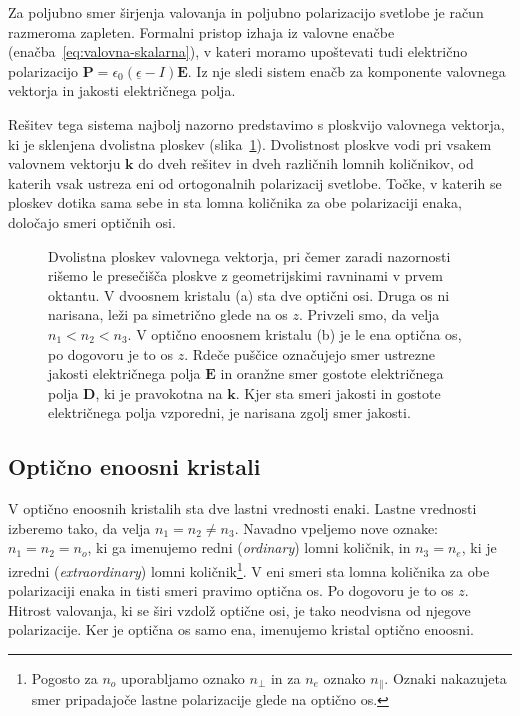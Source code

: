 Za poljubno smer širjenja valovanja in poljubno polarizacijo svetlobe je račun razmeroma zapleten. 
Formalni pristop izhaja iz valovne enačbe (enačba~\ref{eq:valovna-skalarna}), v kateri
moramo upoštevati tudi električno polarizacijo 
$\mathbf{P} = \epsilon_{0}(\underline{\epsilon}-I)\mathbf{E}$. Iz nje sledi 
sistem enačb za komponente valovnega vektorja in jakosti električnega polja. 

Rešitev tega sistema najbolj nazorno predstavimo s ploskvijo valovnega vektorja, 
ki je sklenjena dvolistna ploskev (slika~\ref{kploskev}). Dvolistnost ploskve
vodi pri vsakem valovnem vektorju $\mathbf{k}$ do dveh rešitev in dveh različnih lomnih
količnikov, od katerih vsak ustreza eni od ortogonalnih polarizacij svetlobe. Točke, v katerih
se ploskev dotika sama sebe in sta lomna količnika za obe polarizaciji enaka, 
določajo smeri optičnih osi. 
\begin{figure}[h]
\centering
\def\svgwidth{140truemm} 

\caption{Dvolistna ploskev valovnega vektorja, pri čemer zaradi nazornosti rišemo le presečišča
ploskve z geometrijskimi ravninami v prvem oktantu. 
V dvoosnem kristalu (a) sta dve optični osi. Druga os ni narisana, leži pa 
simetrično glede na os $z$. Privzeli smo, da velja $n_1<n_2<n_3$.
V optično enoosnem kristalu (b) je le ena optična os, 
po dogovoru je to os $z$. Rdeče puščice označujejo smer ustrezne jakosti električnega polja $\mathbf{E}$
in oranžne smer gostote električnega polja $\mathbf{D}$, ki je pravokotna na $\mathbf{k}$. 
Kjer sta smeri jakosti in gostote električnega polja vzporedni, je narisana zgolj smer jakosti.}
\label{kploskev}
\end{figure}

\subsection*{Optično enoosni kristali}
V optično enoosnih kristalih sta dve lastni vrednosti enaki. Lastne vrednosti izberemo
tako, da velja $n_{1}=n_{2}\neq n_{3}$. Navadno vpeljemo nove 
oznake: $n_{1}=n_{2}=n_{o}$, ki ga imenujemo redni (\textit{ordinary})
lomni količnik, in $n_{3}=n_{e}$, ki je izredni 
(\textit{extraordinary}) lomni količnik\footnote{
Pogosto za $n_o$ uporabljamo oznako $n_{\perp}$ in za $n_e$ oznako $n_{\parallel}$. Oznaki
nakazujeta smer pripadajoče lastne polarizacije glede na optično os.}. 
V eni smeri sta lomna količnika za obe polarizaciji enaka in tisti smeri pravimo 
optična os. Po dogovoru je to os $z$. Hitrost valovanja, ki
se širi vzdolž optične osi, je tako neodvisna od njegove polarizacije.
Ker je optična os samo ena, imenujemo kristal optično enoosni. 

